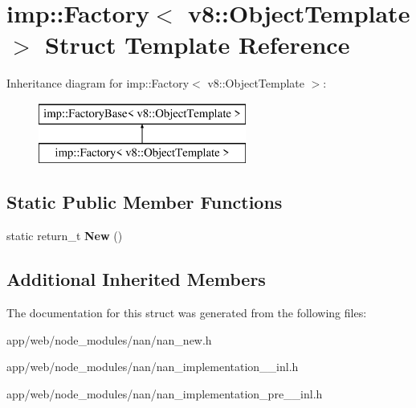 \hypertarget{structimp_1_1_factory_3_01v8_1_1_object_template_01_4}{}\section{imp\+:\+:Factory$<$ v8\+:\+:Object\+Template $>$ Struct Template Reference}
\label{structimp_1_1_factory_3_01v8_1_1_object_template_01_4}
Inheritance diagram for imp\+:\+:Factory$<$ v8\+:\+:Object\+Template $>$\+:\begin{figure}[H]
\begin{center}
\leavevmode
\includegraphics[height=2.000000cm]{structimp_1_1_factory_3_01v8_1_1_object_template_01_4}
\end{center}
\end{figure}
\subsection*{Static Public Member Functions}
\begin{DoxyCompactItemize}
\item 
\mbox{\label{structimp_1_1_factory_3_01v8_1_1_object_template_01_4_a619845aeeb93685e04ce1875ef27512a}} 
static return\+\_\+t {\bfseries New} ()
\end{DoxyCompactItemize}
\subsection*{Additional Inherited Members}


The documentation for this struct was generated from the following files\+:\begin{DoxyCompactItemize}
\item 
app/web/node\+\_\+modules/nan/nan\+\_\+new.\+h\item 
app/web/node\+\_\+modules/nan/nan\+\_\+implementation\+\_\+\_\+inl.\+h\item 
app/web/node\+\_\+modules/nan/nan\+\_\+implementation\+\_\+pre\+\_\+\_\+inl.\+h\end{DoxyCompactItemize}
